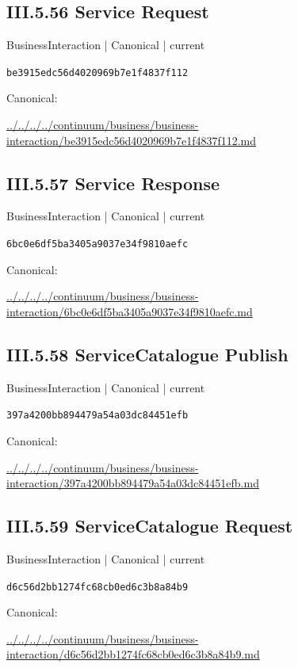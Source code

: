 \documentclass[10pt,a4paper]{article}
\begin{document}
\subsection*{III.5.56 Service Request}
\label{element-be3915edc56d4020969b7e1f4837f112}
{\small BusinessInteraction | Canonical | current}\par
\texttt{be3915edc56d4020969b7e1f4837f112}\par
Canonical: \par
{\footnotesize\url{../../../../continuum/business/business-interaction/be3915edc56d4020969b7e1f4837f112.md}}\par
\subsection*{III.5.57 Service Response}
\label{element-6bc0e6df5ba3405a9037e34f9810aefc}
{\small BusinessInteraction | Canonical | current}\par
\texttt{6bc0e6df5ba3405a9037e34f9810aefc}\par
Canonical: \par
{\footnotesize\url{../../../../continuum/business/business-interaction/6bc0e6df5ba3405a9037e34f9810aefc.md}}\par
\subsection*{III.5.58 ServiceCatalogue Publish}
\label{element-397a4200bb894479a54a03dc84451efb}
{\small BusinessInteraction | Canonical | current}\par
\texttt{397a4200bb894479a54a03dc84451efb}\par
Canonical: \par
{\footnotesize\url{../../../../continuum/business/business-interaction/397a4200bb894479a54a03dc84451efb.md}}\par
\subsection*{III.5.59 ServiceCatalogue Request}
\label{element-d6c56d2bb1274fc68cb0ed6c3b8a84b9}
{\small BusinessInteraction | Canonical | current}\par
\texttt{d6c56d2bb1274fc68cb0ed6c3b8a84b9}\par
Canonical: \par
{\footnotesize\url{../../../../continuum/business/business-interaction/d6c56d2bb1274fc68cb0ed6c3b8a84b9.md}}\par
\end{document}
